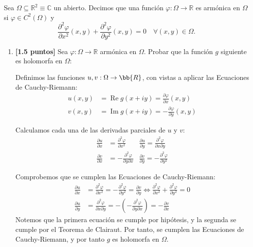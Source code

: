 \documentclass[12pt]{article}
\renewcommand{\Re}{\operatorname{Re}} %
\renewcommand{\Im}{\operatorname{Im}}
\begin{document}
    \begin{ejercicio}
        Sea $\Omega\subseteq \mathbb{R}^2 \equiv\mathbb{C}$ un abierto. Decimos que una función $\varphi:\Omega\to\mathbb{R}$ es armónica en $\Omega$ si $\varphi \in C^2(\Omega)$ y
        \begin{equation*}
            \dfrac{\partial^2 \varphi}{\partial x^2}(x,y)+\dfrac{\partial^2 \varphi}{\partial y^2}(x,y) = 0 \quad \forall (x,y) \in \Omega.
        \end{equation*}
        \begin{enumerate}
            \item \textbf{[1.5 puntos]} Sea $\varphi:\Omega\to\mathbb{R}$ armónica en $\Omega$. Probar que la función $g$ siguiente es holomorfa en $\Omega$:

            Definimos las funciones $u,v:\Omega\to \bb{R}$, con vistas a aplicar las Ecuaciones de Cauchy-Riemann:
        \begin{align*}
            u(x,y) &= \Re g(x+iy) = \frac{\partial \varphi}{\partial x}(x, y)\\
            v(x,y) &= \Im g(x+iy) = -\frac{\partial \varphi}{\partial y}(x, y)
        \end{align*}

        Calculamos cada una de las derivadas parciales de $u$ y $v$:
        \begin{align*}
            \frac{\partial u}{\partial x} &= \frac{\partial^2 \varphi}{\partial x^2}&
            \frac{\partial u}{\partial y} = \frac{\partial^2 \varphi}{\partial x \partial y}\\
            \frac{\partial v}{\partial x} &= -\frac{\partial^2 \varphi}{\partial y \partial x}&
            \frac{\partial v}{\partial y} = -\frac{\partial^2 \varphi}{\partial y^2}
        \end{align*}

        Comprobemos que se cumplen las Ecuaciones de Cauchy-Riemann:
        \begin{align*}
            \frac{\partial u}{\partial x} &= \frac{\partial^2 \varphi}{\partial x^2} = -\frac{\partial^2 \varphi}{\partial y^2} = \frac{\partial v}{\partial y}\iff \frac{\partial^2 \varphi}{\partial x^2} + \frac{\partial^2 \varphi}{\partial y^2} = 0\\
            \frac{\partial u}{\partial y} &= \frac{\partial^2 \varphi}{\partial x \partial y} = -\left(-\frac{\partial^2 \varphi}{\partial y \partial x}\right) = -\frac{\partial v}{\partial x}
        \end{align*}
        Notemos que la primera ecuación se cumple por hipótesis, y la segunda se cumple por el Teorema de Clairaut. Por tanto, se cumplen las Ecuaciones de Cauchy-Riemann, y por tanto $g$ es holomorfa en $\Omega$.


\end{enumerate}
\end{ejercicio}
\end{document}
